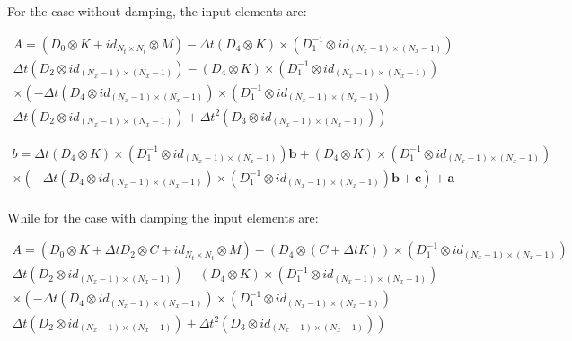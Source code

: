 \documentclass[a4paper, 10pt]{article}
\begin{document}
For the case without damping, the input elements are:

$$
\begin{array}{c}
A = \left(D_0 \otimes K + id_{N_t \times N_t} \otimes  M  \right) - \Delta t \left(D_4 \otimes  K \right) \times \left( D_1^{-1} \otimes  id_{(N_x-1)\times(N_x-1)}\right)  \\
\left. \Delta t \left( D_2 \otimes  id_{(N_x-1)\times(N_x-1)}\right) -  \left( D_4 \otimes   K\right) \times \left( D_1^{-1} \otimes  id_{(N_x-1)\times(N_x-1)}\right) \right. \\
\left.  \times \left( - \Delta t \left(D_4 \otimes  id_{(N_x-1)\times(N_x-1)} \right) \times \left( D_1^{-1} \otimes  id_{(N_x-1)\times(N_x-1)}\right) \right. \right.\\
\left. \Delta t \left( D_2 \otimes  id_{(N_x-1)\times(N_x-1)}\right)  + \Delta t^2 \left( D_3 \otimes  id_{(N_x-1)\times(N_x-1)} \right) \right)
\end{array}
$$

$$
\begin{array}{c}
b = \Delta t \left(D_4 \otimes  K \right) \times \left( D_1^{-1} \otimes  id_{(N_x-1)\times(N_x-1)}\right)  \mathbf{b} +\left( D_4 \otimes   K\right) \times \left( D_1^{-1} \otimes  id_{(N_x-1)\times(N_x-1)}\right) \\
 \times \left( - \Delta t \left(D_4 \otimes  id_{(N_x-1)\times(N_x-1)} \right) \times \left( D_1^{-1} \otimes  id_{(N_x-1)\times(N_x-1)}\right) \mathbf{b}  + \mathbf{c}  \right) + \mathbf{a} \\
\end{array}
$$



While for the case with damping the input elements are:

$$
\begin{array}{c}
A = \left(D_0 \otimes K + \Delta t D_2 \otimes C + id_{N_t \times N_t} \otimes  M  \right) - \left(D_4 \otimes  \left(C+\Delta t K\right)\right) \times \left( D_1^{-1} \otimes  id_{(N_x-1)\times(N_x-1)}\right) \\
\left. \Delta t \left( D_2 \otimes  id_{(N_x-1)\times(N_x-1)}\right) -  \left( D_4 \otimes   K \right) \times \left( D_1^{-1} \otimes  id_{(N_x-1)\times(N_x-1)}\right) \right. \\
\left.  \times \left( - \Delta t \left(D_4 \otimes  id_{(N_x-1)\times(N_x-1)} \right) \times \left( D_1^{-1} \otimes  id_{(N_x-1)\times(N_x-1)}\right) \right. \right. \\
 \left. \Delta t \left( D_2 \otimes  id_{(N_x-1)\times(N_x-1)}\right)  + \Delta t^2 \left( D_3 \otimes  id_{(N_x-1)\times(N_x-1)} \right) \right)  \\
\end{array}
$$
\end{document}
